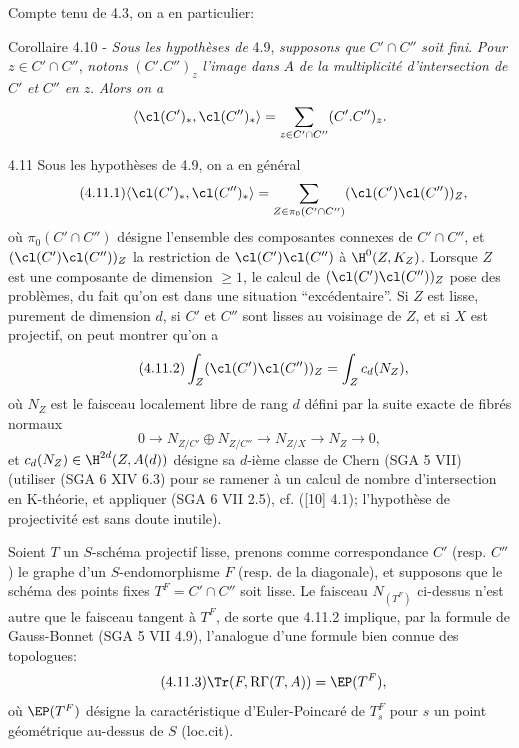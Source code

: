 Compte tenu de 4.3, on a en particulier:

\begin{statement}{Corollaire 4.10 -}
\emph{Sous les hypothèses de} 4.9, \emph{supposons que} $C'\cap C''$ \emph{soit fini}. \emph{Pour} $z\in C'\cap C''$, \emph{notons} $(C'.C'')_z$ \emph{l'image dans} $A$ \emph{de la multiplicité d'intersection de} $C'$ \emph{et} $C''$ \emph{en} $z$. \emph{Alors on a}
\[
\langle \cl(C')_*,\cl(C'')_*\rangle
=
\sum_{z\in C'\cap C''}(C'.C'')_z.
\]
\end{statement}

\begin{statement}{4.11}
Sous les hypothèses de 4.9, on a en général
\begin{equation}
\tag{4.11.1}
\langle \cl(C')_*,\cl(C'')_*\rangle
=
\sum_{Z\in\pi_0(C'\cap C'')}(\cl(C')\cl(C''))_Z,
\end{equation}
où $\pi_0(C'\cap C'')$ désigne l'ensemble des composantes connexes de $C'\cap C''$, et $(\cl(C')\cl(C''))_Z$ la restriction de $\cl(C')\cl(C'')$ à $\H^0(Z,K_Z)$. Lorsque $Z$ est une composante de dimension $\geq 1$, le calcul de $(\cl(C')\cl(C''))_Z$ pose des problèmes, du fait qu'on est dans une situation ``excédentaire''. Si $Z$ est lisse, purement de dimension $d$, si $C'$ et $C''$ sont lisses au voisinage de $Z$, et si $X$ est projectif, on peut montrer qu'on a
\begin{equation}
\tag{4.11.2}
\int_Z(\cl(C')\cl(C''))_Z=\int_Z c_d(N_Z),
\end{equation}
où $N_Z$ est le faisceau localement libre de rang $d$ défini par la suite exacte de fibrés normaux
\[
0\longrightarrow N_{Z/C'}\oplus N_{Z/C''}\longrightarrow N_{Z/X}\longrightarrow N_Z\longrightarrow 0,
\]
et $c_d(N_Z)\in \H^{2d}(Z,A(d))$ désigne sa $d$-ième classe de Chern (SGA 5 VII) (utiliser (SGA 6 XIV 6.3) pour se ramener à un calcul de nombre d'intersection en K-théorie, et appliquer (SGA 6 VII 2.5), cf. ([10] 4.1); l'hypothèse de projectivité est sans doute inutile).

Soient $T$ un $S$-schéma projectif lisse, prenons comme correspondance $C'$ (resp. $C''$) le graphe d'un $S$-endomorphisme $F$ (resp. de la diagonale), et supposons que le schéma des points fixes $T^F=C'\cap C''$ soit lisse. Le faisceau $N_{(T^F)}$ ci-dessus n'est autre que le faisceau tangent à $T^F$, de sorte que 4.11.2 implique, par la formule de Gauss-Bonnet (SGA 5 VII 4.9), l'analogue d'une formule bien connue des topologues:
\begin{equation}
\tag{4.11.3}
\Tr(F,\mathrm{R}\Gamma(T,A))=\EP(T^F),
\end{equation}
où $\EP(T^F)$ désigne la caractéristique d'Euler-Poincaré de $T_s^F$ pour $s$ un point géométrique au-dessus de $S$ (loc.cit).
\end{statement}


